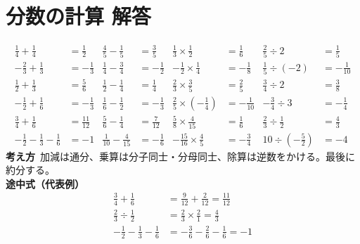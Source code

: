 \documentclass[paper=b4j,landscape,twocolumn,fleqn]{jlreq}
\begin{document}
\section{分数の計算 解答}
\begin{align*}
\frac{1}{4}+\frac{1}{4}&=\frac{1}{2} & \frac{4}{5}-\frac{1}{5}&=\frac{3}{5} & \frac{1}{3}\times\frac{1}{2}&=\frac{1}{6} & \frac{2}{5}\div2&=\frac{1}{5}\\
-\frac{2}{3}+\frac{1}{3}&=-\frac{1}{3} & \frac{1}{4}-\frac{3}{4}&=-\frac{1}{2} & -\frac{1}{2}\times\frac{1}{4}&=-\frac{1}{8} & \frac{1}{5}\div(-2)&=-\frac{1}{10}\\
\frac{1}{2}+\frac{1}{3}&=\frac{5}{6} & \frac{1}{2}-\frac{1}{4}&=\frac{1}{4} & \frac{2}{3}\times\frac{3}{5}&=\frac{2}{5} & \frac{3}{4}\div2&=\frac{3}{8}\\
-\frac{1}{2}+\frac{1}{6}&=-\frac{1}{3} & \frac{1}{6}-\frac{1}{2}&=-\frac{1}{3} & \frac{2}{5}\times\left(-\frac{1}{4}\right)&=-\frac{1}{10} & -\frac{3}{4}\div3&=-\frac{1}{4}\\
\frac{3}{4}+\frac{1}{6}&=\frac{11}{12} & \frac{5}{6}-\frac{1}{4}&=\frac{7}{12} & \frac{5}{8}\times\frac{4}{15}&=\frac{1}{6} & \frac{2}{3}\div\frac{1}{2}&=\frac{4}{3}\\
-\frac{1}{2}-\frac{1}{3}-\frac{1}{6}&=-1 & \frac{1}{10}-\frac{4}{15}&=-\frac{1}{6} & -\frac{15}{16}\times\frac{4}{5}&=-\frac{3}{4} & 10\div\left(-\frac{5}{2}\right)&=-4
\end{align*}
\textbf{考え方}\
加減は通分、乗算は分子同士・分母同士、除算は逆数をかける。最後に約分する。\\
\textbf{途中式（代表例）}
\begin{align*}
\frac{3}{4}+\frac{1}{6}&=\frac{9}{12}+\frac{2}{12}=\frac{11}{12}\\
\frac{2}{3}\div\frac{1}{2}&=\frac{2}{3}\times\frac{2}{1}=\frac{4}{3}\\
-\frac{1}{2}-\frac{1}{3}-\frac{1}{6}&= -\frac{3}{6}-\frac{2}{6}-\frac{1}{6}=-1
\end{align*}

\newpage
\end{document}
